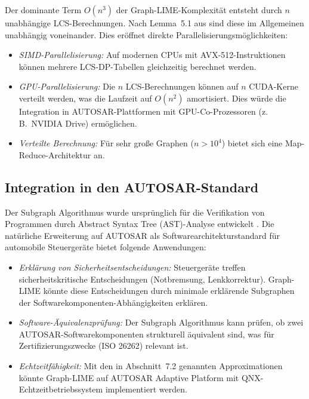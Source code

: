 ﻿\documentclass[a4paper,12pt]{article}
\theoremstyle{definition}
\begin{document}
Der dominante Term $O(n^3)$ der Graph-LIME-Komplexität entsteht durch $n$
unabhängige LCS-Berechnungen.
Nach Lemma~5.1 aus \citet{Epp2026} sind diese im Allgemeinen unabhängig voneinander.
Dies eröffnet direkte Parallelisierungsmöglichkeiten:

\begin{itemize}
  \item \emph{SIMD-Parallelisierung:} Auf modernen CPUs mit AVX-512-Instruktionen
        können mehrere LCS-DP-Tabellen gleichzeitig berechnet werden.
  \item \emph{GPU-Parallelisierung:} Die $n$ LCS-Berechnungen können auf $n$
        CUDA-Kerne verteilt werden, was die Laufzeit auf
        $O(n^2)$ amortisiert.
        Dies würde die Integration in AUTOSAR-Plattformen mit GPU-Co-Prozessoren
        (z.\,B.\ NVIDIA Drive) ermöglichen.
  \item \emph{Verteilte Berechnung:} Für sehr große Graphen ($n > 10^4$) bietet
        sich eine Map-Reduce-Architektur an.
\end{itemize}

\subsection{Integration in den AUTOSAR-Standard}

Der Subgraph Algorithmus wurde ursprünglich für die Verifikation von
Programmen durch Abstract Syntax Tree (AST)-Analyse entwickelt \citep{Epp2026}.
Die natürliche Erweiterung auf AUTOSAR \citep{AUTOSAR2023} als
Softwarearchitekturstandard für automobile Steuergeräte bietet
folgende Anwendungen:

\begin{itemize}
  \item \emph{Erklärung von Sicherheitsentscheidungen:} Steuergeräte treffen
        sicherheitskritische Entscheidungen (Notbremsung, Lenkkorrektur).
        Graph-LIME könnte diese Entscheidungen durch minimale erklärende
        Subgraphen der Softwarekomponenten-Abhängigkeiten erklären.
  \item \emph{Software-Äquivalenzprüfung:} Der Subgraph Algorithmus kann
        prüfen, ob zwei AUTOSAR-Softwarekomponenten strukturell äquivalent sind,
        was für Zertifizierungszwecke (ISO 26262) relevant ist.
  \item \emph{Echtzeitfähigkeit:} Mit den in Abschnitt~7.2 genannten
        Approximationen könnte Graph-LIME auf AUTOSAR Adaptive Platform mit
        QNX-Echtzeitbetriebssystem implementiert werden.
\end{itemize}
\end{document}
